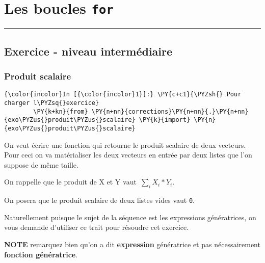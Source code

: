     
    
    
    

    

    \hypertarget{les-boucles-for}{%
\section{\texorpdfstring{Les boucles
\texttt{for}}{Les boucles for}}\label{les-boucles-for}}

    \begin{center}\rule{0.5\linewidth}{\linethickness}\end{center}

    \hypertarget{exercice---niveau-intermuxe9diaire}{%
\subsection{Exercice - niveau
intermédiaire}\label{exercice---niveau-intermuxe9diaire}}

    \hypertarget{produit-scalaire}{%
\subsubsection{Produit scalaire}\label{produit-scalaire}}

    \begin{Verbatim}[commandchars=\\\{\},frame=single,framerule=0.3mm,rulecolor=\color{cellframecolor}]
{\color{incolor}In [{\color{incolor}1}]:} \PY{c+c1}{\PYZsh{} Pour charger l\PYZsq{}exercice}
        \PY{k+kn}{from} \PY{n+nn}{corrections}\PY{n+nn}{.}\PY{n+nn}{exo\PYZus{}produit\PYZus{}scalaire} \PY{k}{import} \PY{n}{exo\PYZus{}produit\PYZus{}scalaire}
\end{Verbatim}


    On veut écrire une fonction qui retourne le produit scalaire de deux
vecteurs. Pour ceci on va matérialiser les deux vecteurs en entrée par
deux listes que l'on suppose de même taille.

On rappelle que le produit de X et Y vaut~\(\sum_{i} X_i * Y_i\).

On posera que le produit scalaire de deux listes vides vaut \texttt{0}.

    Naturellement puisque le sujet de la séquence est les expressions
génératrices, on vous demande d'utiliser ce trait pour résoudre cet
exercice.

\textbf{NOTE} remarquez bien qu'on a dit \textbf{expression} génératrice
et pas nécessairement \textbf{fonction génératrice}.

